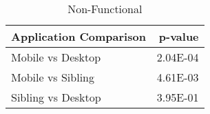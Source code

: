 \begin{table}[ht]
\centering
\caption{Non-Functional} 
\begin{tabular}{lr}
  \hline
Application Comparison & p-value \\ 
  \hline
Mobile vs Desktop & 2.04E-04 \\ 
  Mobile vs Sibling & 4.61E-03 \\ 
  Sibling vs Desktop & 3.95E-01 \\ 
   \hline
\end{tabular}
\end{table}
